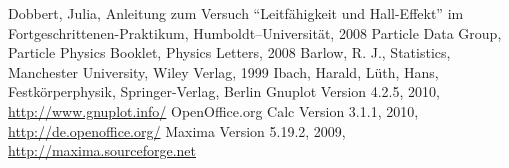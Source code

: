 \renewcommand{\refname}{Literatur und Programme}
\begin{thebibliography}{xxxxxx}
Dobbert, Julia, Anleitung zum Versuch ``Leitfähigkeit und Hall-Effekt'' im Fortgeschrittenen-Praktikum, Humboldt–Universität, 2008
Particle Data Group, Particle Physics Booklet, Physics Letters, 2008
Barlow, R. J., Statistics, Manchester University, Wiley Verlag, 1999
Ibach, Harald, Lüth, Hans, Festkörperphysik, Springer-Verlag, Berlin
Gnuplot Version 4.2.5, 2010,
\href{http://www.gnuplot.info/}{http://www.gnuplot.info/}
OpenOffice.org Calc Version 3.1.1, 2010,
\href{http://de.openoffice.org/}{http://de.openoffice.org/}
Maxima Version 5.19.2, 2009, \href{http://maxima.sourceforge.net}{http://maxima.sourceforge.net}
\end{thebibliography}